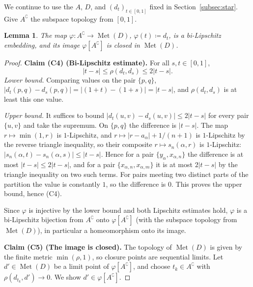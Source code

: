 \documentclass[12pt]{article}
\newtheorem{lemma}[theorem]{Lemma}
\theoremstyle{definition}
\newcommand{\Met}{\operatorname{Met}}
\begin{document}
We continue to use the $A$, $D$, and $(d_t)_{t\in[0,1]}$ fixed in
Section~\ref{subsec:star}. Give $A^\complement$ the subspace topology
from $[0,1]$.

\begin{lemma}
  \label{lem:closed-image}
  The map $\varphi \colon A^\complement \to \Met(D)$, $\varphi(t) \coloneqq d_t$, is a
  bi-Lipschitz embedding, and its image $\varphi[A^\complement]$ is
  closed in $\Met(D)$.
\end{lemma}

\begin{proof}
  \noindent\textbf{Claim (C4) (Bi-Lipschitz estimate).} For all $s,t\in[0,1]$,
  \[
    \lvert t-s\rvert \le \rho(d_t,d_s) \le  2\lvert t-s\rvert .
  \]
  \emph{Lower bound.} Comparing values on the pair $\{p,q\}$,
  $\lvert d_t(p,q)-d_s(p,q)\rvert = \lvert(1+t)-(1+s)\rvert = \lvert
  t-s\rvert$, and $\rho(d_t,d_s)$ is at least this one value.

  \emph{Upper bound.} It suffices to bound $\lvert d_t(u,v)-d_s(u,v)\rvert
  \le 2\lvert t-s\rvert$ for every pair $\{u,v\}$ and take the supremum. On
  $\{p,q\}$ the difference is $\lvert t-s\rvert$. The map $r
  \mapsto \min(1,r)$ is $1$-Lipschitz, and $r \mapsto \lvert r-a_\alpha\rvert
  + 1/(n+1)$ is $1$-Lipschitz by the reverse triangle inequality, so their
  composite $r \mapsto s_n(\alpha,r)$ is $1$-Lipschitz: $\lvert
  s_n(\alpha,t)-s_n(\alpha,s)\rvert \le \lvert t-s\rvert$. Hence for a
  pair $\{y_\alpha, x_{\alpha,n}\}$ the difference is at most $\lvert
  t-s\rvert \le 2\lvert t-s\rvert$, and for a pair
  $\{x_{\alpha,n},x_{\alpha,m}\}$ it is at most $2\lvert t-s\rvert$ by the
  triangle inequality on two such terms. For pairs meeting two distinct
  parts of the partition the value is constantly $1$, so the difference is
  $0$. This proves the upper bound, hence (C4).

  Since $\varphi$ is injective by the lower bound and both Lipschitz
  estimates hold, $\varphi$ is a bi-Lipschitz bijection from
  $A^\complement$ onto $\varphi[A^\complement]$ (with the subspace topology
  from $\Met(D)$), in particular a homeomorphism onto its image.

  \medskip\noindent\textbf{Claim (C5) (The image is closed).} The topology of $\Met(D)$ is given
  by the finite metric $\min(\rho,1)$, so closure points are sequential
  limits. Let $d' \in \Met(D)$ be a limit point of
  $\varphi[A^\complement]$, and choose $t_k \in A^\complement$ with
  $\rho(d_{t_k},d')\to 0$. We show $d' \in \varphi[A^\complement]$.


\end{proof}
\end{document}
